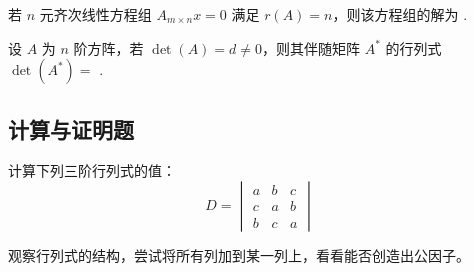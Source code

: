 \documentclass[a4paper, 12pt]{ctexart}
\begin{document}
\vspace{0.5cm}

\begin{exercise}
    若 $n$ 元齐次线性方程组 $A_{m \times n}x=0$ 满足 $r(A)=n$，则该方程组的解为 \underline{\hspace{3cm}}.
\end{exercise}

\vspace{0.5cm}

\begin{exercise}
    设 $A$ 为 $n$ 阶方阵，若 $\det(A) = d \neq 0$，则其伴随矩阵 $A^*$ 的行列式 $\det(A^*) = $ \underline{\hspace{2cm}}.
\end{exercise}

\vspace{1cm}

\subsection{计算与证明题}

\begin{exampleexercise}[作答范例]
    计算下列三阶行列式的值：
    $$
    D = \begin{vmatrix}
    a & b & c \\
    c & a & b \\
    b & c & a
    \end{vmatrix}
    $$
\end{exampleexercise}

\begin{hint}
    观察行列式的结构，尝试将所有列加到某一列上，看看能否创造出公因子。
\end{hint}
\end{document}
